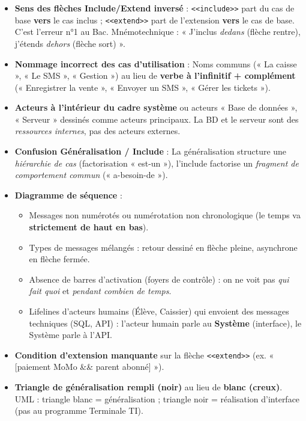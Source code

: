 \documentclass[11pt]{article}
\begin{document}
\begin{attention}
\begin{itemize}
  \item \textbf{Sens des flèches Include/Extend inversé} : \texttt{<<include>>} part du cas de base \textbf{vers} le cas inclus ; \texttt{<<extend>>} part de l'extension \textbf{vers} le cas de base. C'est l'erreur n°1 au Bac. Mnémotechnique : « J'inclus \emph{dedans} (flèche rentre), j'étends \emph{dehors} (flèche sort) ».
  \item \textbf{Nommage incorrect des cas d'utilisation} : Noms communs (« La caisse », « Le SMS », « Gestion ») au lieu de \textbf{verbe à l'infinitif + complément} (« Enregistrer la vente », « Envoyer un SMS », « Gérer les tickets »).
  \item \textbf{Acteurs à l'intérieur du cadre système} ou acteurs « Base de données », « Serveur » dessinés comme acteurs principaux. La BD et le serveur sont des \emph{ressources internes}, pas des acteurs externes.
  \item \textbf{Confusion Généralisation / Include} : La généralisation structure une \emph{hiérarchie de cas} (factorisation « est-un »), l'include factorise un \emph{fragment de comportement commun} (« a-besoin-de »).
  \item \textbf{Diagramme de séquence} :
        \begin{itemize}
          \item Messages non numérotés ou numérotation non chronologique (le temps va \textbf{strictement de haut en bas}).
          \item Types de messages mélangés : retour dessiné en flèche pleine, asynchrone en flèche fermée.
          \item Absence de barres d'activation (foyers de contrôle) : on ne voit pas \emph{qui fait quoi} et \emph{pendant combien de temps}.
          \item Lifelines d'acteurs humains (Élève, Caissier) qui envoient des messages techniques (SQL, API) : l'acteur humain parle au \textbf{Système} (interface), le Système parle à l'API.
        \end{itemize}
  \item \textbf{Condition d'extension manquante} sur la flèche \texttt{<<extend>>} (ex. « [paiement MoMo \&\& parent abonné] »).
  \item \textbf{Triangle de généralisation rempli (noir)} au lieu de \textbf{blanc (creux)}. UML : triangle blanc = généralisation ; triangle noir = réalisation d'interface (pas au programme Terminale TI).
\end{itemize}
\end{attention}
\end{document}
